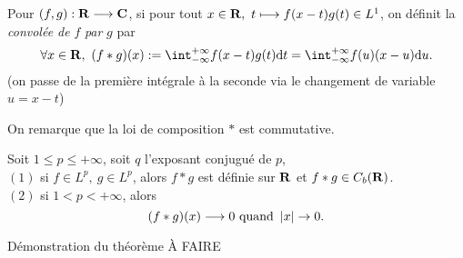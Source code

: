 \documentclass[a4paper,11pt, twoside]{article}
\begin{document}

\begin{Def}
  Pour $(f,g):\mathbf R\longrightarrow\mathbf C$, si pour tout $x\in \mathbf R,\ t\longmapsto f(x-t)g(t)\in L^1$, on définit la \emph{convolée de }$f$\emph{ par }$g$ par 
  $$\forall x\in\R,\ (f*g)(x):=\int_{-\infty}^{+\infty}f(x-t)g(t)\dt=\int_{-\infty}^{+\infty}f(u)(x-u)\mathrm du.$$
  (on passe de la première intégrale à la seconde via le changement de variable $u=x-t$)
\end{Def}


\begin{RQ}
  On remarque que la loi de composition $*$ est commutative.
\end{RQ}


\begin{Th}
  Soit $1\leqslant p\leqslant +\infty$, soit $q$ l'exposant conjugué de $p$,\\

  $(\mathit 1)$ si $f\in L^p,\ g\in L^p$, alors $f*g$ est définie sur $\mathbf R$ et $f*g\in C_b(\mathbf R)$.\\
  $(\mathit 2)$ si $1<p<+\infty$, alors 
  $$(f*g)(x)\longrightarrow 0\text{ quand }\left| x\right|\to 0.$$ 
\end{Th}


\begin{Proof}{Démonstration du théorème}
  À FAIRE
\end{Proof}
\end{document}
